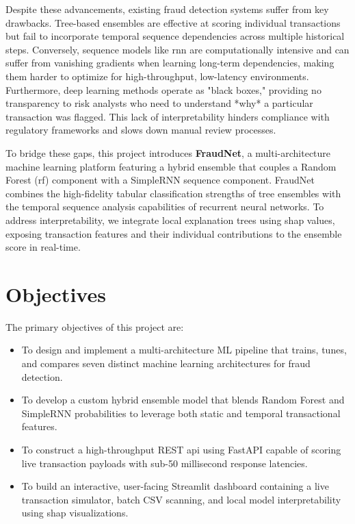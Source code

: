 Despite these advancements, existing fraud detection systems suffer from key drawbacks. Tree-based ensembles are effective at scoring individual transactions but fail to incorporate temporal sequence dependencies across multiple historical steps. Conversely, sequence models like \gls{rnn} are computationally intensive and can suffer from vanishing gradients when learning long-term dependencies, making them harder to optimize for high-throughput, low-latency environments. Furthermore, deep learning methods operate as "black boxes," providing no transparency to risk analysts who need to understand *why* a particular transaction was flagged. This lack of interpretability hinders compliance with regulatory frameworks and slows down manual review processes.

To bridge these gaps, this project introduces \textbf{FraudNet}, a multi-architecture machine learning platform featuring a hybrid ensemble that couples a Random Forest (\gls{rf}) component with a SimpleRNN sequence component. FraudNet combines the high-fidelity tabular classification strengths of tree ensembles with the temporal sequence analysis capabilities of recurrent neural networks. To address interpretability, we integrate local explanation trees using \gls{shap} values, exposing transaction features and their individual contributions to the ensemble score in real-time.

\section{Objectives}

The primary objectives of this project are:
\begin{itemize}
    \item To design and implement a multi-architecture ML pipeline that trains, tunes, and compares seven distinct machine learning architectures for fraud detection.
    \item To develop a custom hybrid ensemble model that blends Random Forest and SimpleRNN probabilities to leverage both static and temporal transactional features.
    \item To construct a high-throughput REST \gls{api} using FastAPI capable of scoring live transaction payloads with sub-50 millisecond response latencies.
    \item To build an interactive, user-facing Streamlit dashboard containing a live transaction simulator, batch CSV scanning, and local model interpretability using \gls{shap} visualizations.
\end{itemize}

